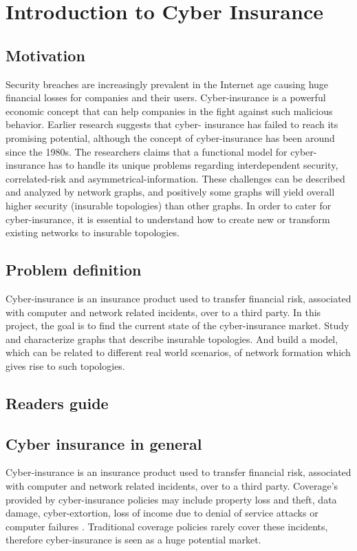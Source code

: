 \chapter{Introduction to Cyber Insurance}
\label{chp:introductionToCyberInsurance} 

\section{Motivation}
Security breaches are increasingly prevalent in the Internet age causing huge financial losses
for companies and their users. Cyber-insurance is a powerful economic concept that can help
companies in the fight against such malicious behavior. Earlier research suggests that cyber-
insurance has failed to reach its promising potential, although the concept of cyber-insurance has
been around since the 1980s. The researchers claims that a functional model for cyber-insurance has to handle its unique problems regarding interdependent security, correlated-risk and asymmetrical-information. These challenges can be described and analyzed by network graphs, and positively some graphs will yield overall higher security (insurable topologies) than other graphs. In order to cater for cyber-insurance, it is essential to understand how to create new or transform existing networks to insurable topologies.

\section{Problem definition}
Cyber-insurance is an insurance product used to transfer financial risk, associated with computer and network related incidents, over to a third party.
In this project, the goal is to find the current state of the cyber-insurance market. Study and characterize graphs that describe insurable topologies. And build a model, which can be related to different real world scenarios, of network formation which gives rise to such topologies.
\section{Readers guide}


\section{Cyber insurance in general}
Cyber-insurance is an insurance product used to transfer financial risk, associated with computer and network related incidents, over to a third party.
 Coverage’s provided by cyber-insurance policies may include property loss and theft, data damage, cyber-extortion, loss of income due to denial of service attacks or computer failures 
 \cite{washingtonpaper}.
Traditional coverage policies rarely cover these incidents, therefore cyber-insurance is seen as a huge potential market.

